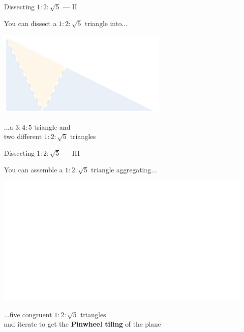 \documentclass[14pt]{beamer}
\begin{document}

    \begin{frame}{Dissecting $1\!\!:\!\!2\!\!:\!\!\sqrt{5}$ --- II}
        \begin{center}
            You can dissect a $1\!\!:\!\!2\!\!:\!\!\sqrt{5}$ triangle into...

            \bigskip \bigskip

            \includegraphics[height=18ex]{figures/figure006i.pdf}

            \bigskip \bigskip

            ...a $3\!\!:\!\!4\!\!:\!\!5$ triangle and\\two different $1\!\!:\!\!2\!\!:\!\!\sqrt{5}$ triangles
        \end{center}
    \end{frame}


    \begin{frame}{Dissecting $1\!\!:\!\!2\!\!:\!\!\sqrt{5}$ --- III}
        \begin{center}
            You can assemble a $1\!\!:\!\!2\!\!:\!\!\sqrt{5}$ triangle aggregating...

            \bigskip \bigskip

            \includegraphics[height=18ex]{figures/figure006g.pdf}

            \bigskip \bigskip

            ...five congruent $1\!\!:\!\!2\!\!:\!\!\sqrt{5}$ triangles\\and iterate to get the \textbf{Pinwheel tiling} of the plane
        \end{center}
    \end{frame}
\end{document}

